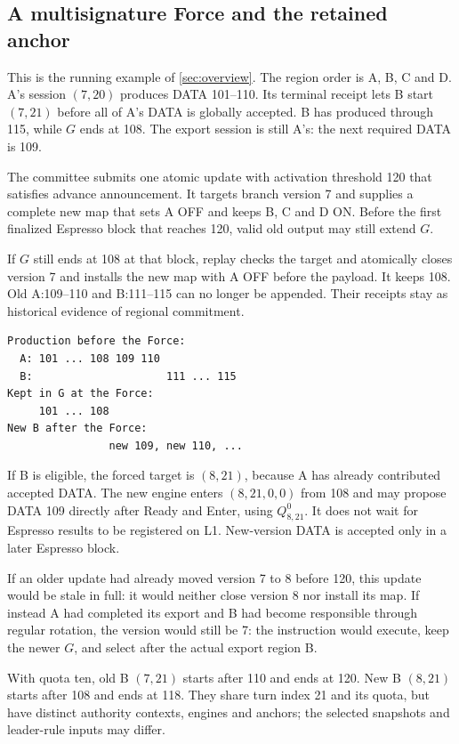 \documentclass[11pt,a4paper]{article}
\begin{document}
\subsection{A multisignature Force and the retained anchor}
\label{sec:force-example}
This is the running example of \cref{sec:overview}. The region order is
A, B, C and D. A's session $(7,20)$ produces DATA 101--110. Its terminal receipt
lets B start $(7,21)$ before all of A's DATA is globally accepted. B has
produced through 115, while $G$ ends at 108. The export session is still
A's: the next required DATA is 109.

The committee submits one atomic update with activation threshold 120
that satisfies advance announcement. It targets branch version 7 and
supplies a complete new map that sets A OFF and keeps B, C and D ON.
Before the first finalized Espresso block that
reaches 120, valid old output may still extend $G$.

If $G$ still ends at 108 at that block, replay checks the target and
atomically closes version 7 and installs the new map with A OFF before
the payload. It keeps 108. Old
A:109--110 and B:111--115 can no longer be appended. Their receipts stay
as historical evidence of regional commitment.

\begin{center}\small
\begin{verbatim}
Production before the Force:
  A: 101 ... 108 109 110
  B:                     111 ... 115
Kept in G at the Force:
     101 ... 108
New B after the Force:
                new 109, new 110, ...
\end{verbatim}
\end{center}

If B is eligible, the forced target is $(8,21)$, because A has already
contributed accepted DATA. The new engine enters $(8,21,0,0)$ from 108 and
may propose DATA 109 directly after Ready and Enter, using $Q^0_{8,21}$. It does not
wait for Espresso results to be registered on L1. New-version DATA is
accepted only in a later Espresso block.

If an older update had already moved version 7 to 8 before 120, this
update would be stale in full: it would neither close version 8 nor
install its map. If instead A had completed its export and B had become
responsible through regular rotation, the version would still be 7: the
instruction would execute, keep the newer $G$, and select after the
actual export region B.

With quota ten, old B $(7,21)$ starts after 110 and ends at 120. New B
$(8,21)$ starts after 108 and ends at 118. They share turn index 21 and
its quota, but have distinct authority contexts, engines and anchors;
the selected snapshots and leader-rule inputs may differ.
\end{document}
